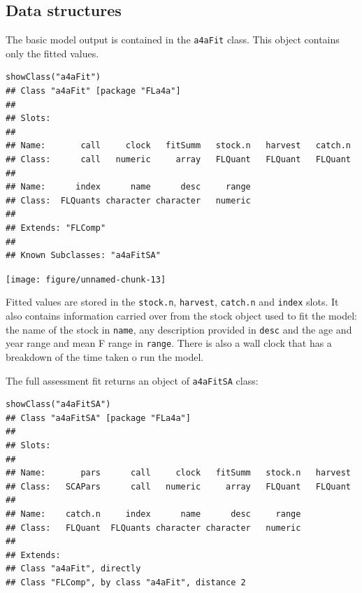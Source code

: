 \documentclass[a4paper,english,10pt]{article}\usepackage[]{graphicx}\usepackage[]{color}
\makeatletter
\newenvironment{kframe}{%
 \def\at@end@of@kframe{}%
 \ifinner\ifhmode%
  \def\at@end@of@kframe{\end{minipage}}%
  \begin{minipage}{\columnwidth}%
 \fi\fi%
 \def\FrameCommand##1{\hskip\@totalleftmargin \hskip-\fboxsep
 \colorbox{shadecolor}{##1}\hskip-\fboxsep
     \hskip-\linewidth \hskip-\@totalleftmargin \hskip\columnwidth}%
 \MakeFramed {\advance\hsize-\width
   \@totalleftmargin\z@ \linewidth\hsize
   \@setminipage}}%
 {\par\unskip\endMakeFramed%
 \at@end@of@kframe}
\newenvironment{knitrout}{}{} %
\makeatother
\begin{document}
\subsection{Data structures}

The basic model output is contained in the \texttt{a4aFit} class. This object contains only the fitted values.

\begin{knitrout}
\color{fgcolor}\begin{kframe}
\begin{verbatim}
showClass("a4aFit")
## Class "a4aFit" [package "FLa4a"]
## 
## Slots:
##                                                                   
## Name:       call     clock   fitSumm   stock.n   harvest   catch.n
## Class:      call   numeric     array   FLQuant   FLQuant   FLQuant
##                                               
## Name:      index      name      desc     range
## Class:  FLQuants character character   numeric
## 
## Extends: "FLComp"
## 
## Known Subclasses: "a4aFitSA"
\end{verbatim}
\end{kframe}
\end{knitrout}


\begin{knitrout}
\color{fgcolor}

{\centering \texttt{[image: figure/unnamed-chunk-13]} 

}



\end{knitrout}


Fitted values are stored in the \texttt{stock.n}, \texttt{harvest}, \texttt{catch.n} and \texttt{index} slots.  It also contains information carried over from the stock object used to fit the model: the name of the stock in \texttt{name}, any description provided in \texttt{desc} and the age and year range and mean F range in \texttt{range}.  There is also a wall clock that has a breakdown of the time taken o run the model.

The full assessment fit returns an object of \texttt{a4aFitSA} class:

\begin{knitrout}
\color{fgcolor}\begin{kframe}
\begin{verbatim}
showClass("a4aFitSA")
## Class "a4aFitSA" [package "FLa4a"]
## 
## Slots:
##                                                                   
## Name:       pars      call     clock   fitSumm   stock.n   harvest
## Class:   SCAPars      call   numeric     array   FLQuant   FLQuant
##                                                         
## Name:    catch.n     index      name      desc     range
## Class:   FLQuant  FLQuants character character   numeric
## 
## Extends: 
## Class "a4aFit", directly
## Class "FLComp", by class "a4aFit", distance 2
\end{verbatim}
\end{kframe}
\end{knitrout}
\end{document}
